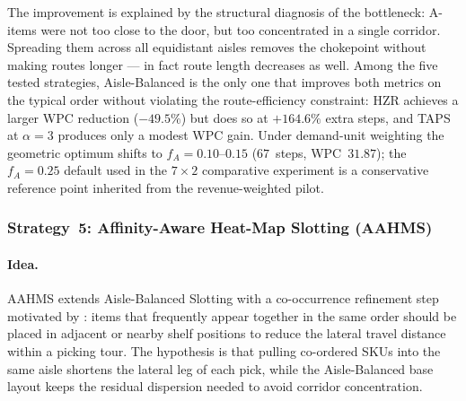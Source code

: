 \documentclass[12pt,a4paper]{article}
\begin{document}
The improvement is explained by the structural diagnosis of the bottleneck:
A-items were not too close to the door, but too concentrated in a single
corridor. Spreading them across all equidistant aisles removes the chokepoint
without making routes longer --- in fact route length decreases as well.
Among the five tested strategies, Aisle-Balanced is the only one that
improves both metrics on the typical order without violating the
route-efficiency constraint: HZR achieves a larger WPC reduction
($-49.5\%$) but does so at $+164.6\%$ extra steps, and TAPS at
$\alpha = 3$ produces only a modest WPC gain. Under demand-unit weighting
the geometric optimum shifts to $f_A = 0.10$--$0.15$
($67$~steps, WPC~$31.87$); the $f_A = 0.25$ default used in the $7 \times 2$
comparative experiment is a conservative reference point inherited from the
revenue-weighted pilot.

\subsubsection{Strategy~5: Affinity-Aware Heat-Map Slotting (AAHMS)}

\paragraph{Idea.}
AAHMS extends Aisle-Balanced Slotting with a co-occurrence refinement step
motivated by \cite{ref3}: items that frequently appear together in the same order
should be placed in adjacent or nearby shelf positions to reduce the lateral travel
distance within a picking tour.
The hypothesis is that pulling co-ordered SKUs into the same aisle shortens the
lateral leg of each pick, while the Aisle-Balanced base layout keeps the residual
dispersion needed to avoid corridor concentration.
\end{document}
